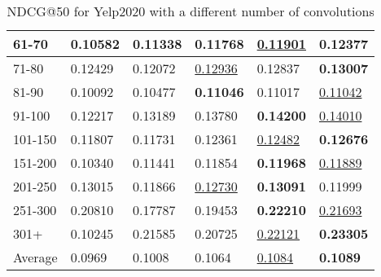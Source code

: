 \begin{table*}[]
\begin{tabular}{|l|l|l|l|l|l|}
        61-70   & 0.10582                    & 0.11338                    & 0.11768                    & \underline{0.11901}        & \textbf{0.12377}           \\ \hline
        71-80   & 0.12429                    & 0.12072                    & \underline{0.12936}        & 0.12837                    & \textbf{0.13007}           \\ \hline
        81-90   & 0.10092                    & 0.10477                    & \textbf{0.11046}           & 0.11017                    & \underline{0.11042}        \\ \hline
        91-100  & 0.12217                    & 0.13189                    & 0.13780                    & \textbf{0.14200}           & \underline{0.14010}        \\ \hline
        101-150 & 0.11807                    & 0.11731                    & 0.12361                    & \underline{0.12482}        & \textbf{0.12676}           \\ \hline
        151-200 & 0.10340                    & 0.11441                    & 0.11854                    & \textbf{0.11968}           & \underline{0.11889}        \\ \hline
        201-250 & 0.13015                    & 0.11866                    & \underline{0.12730}        & \textbf{0.13091}           & 0.11999                    \\ \hline
        251-300 & 0.20810                    & 0.17787                    & 0.19453                    & \textbf{0.22210}           & \underline{0.21693}        \\ \hline
        301+    & 0.10245                    & 0.21585                    & 0.20725                    & \underline{0.22121}        & \textbf{0.23305}           \\ \hline
        Average & 0.0969                     & 0.1008                     & 0.1064                     & \underline{0.1084}         & \textbf{0.1089}            \\ \hline
    \end{tabular}
    \caption{NDCG@50 for Yelp2020 with a different number of convolutions}
    \label{tab:yelp2020-con-evaluation}
\end{table*}

